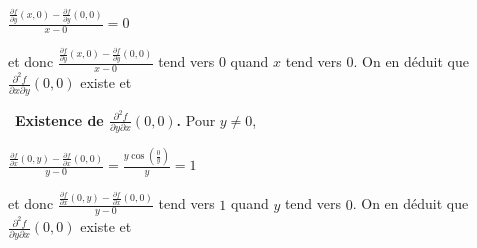 {\begin{enumerate}
{\begin{center}
$\frac{\frac{\partial f}{\partial y}(x,0)-\frac{\partial f}{\partial y}(0,0)}{x-0}=0$
\end{center}
et donc $\frac{\frac{\partial f}{\partial y}(x,0)-\frac{\partial f}{\partial y}(0,0)}{x-0}$ tend vers $0$ quand $x$ tend vers $0$. On en déduit que $\frac{\partial^2f}{\partial x\partial y}(0,0)$ existe et

\begin{center}
\end{center}
\textbullet~\textbf{Existence de $\frac{\partial^2f}{\partial y\partial x}(0,0)$.} Pour $y\neq0$,

\begin{center}
$\frac{\frac{\partial f}{\partial x}(0,y)-\frac{\partial f}{\partial x}(0,0)}{y-0}=\frac{y\cos\left(\frac{0}{y}\right)}{y}=1$
\end{center}
et donc $\frac{\frac{\partial f}{\partial x}(0,y)-\frac{\partial f}{\partial x}(0,0)}{y-0}$ tend vers $1$ quand $y$ tend vers $0$. On en déduit que $\frac{\partial^2f}{\partial y\partial x}(0,0)$ existe et

\begin{center}
\end{center}}
\end{enumerate}
}
